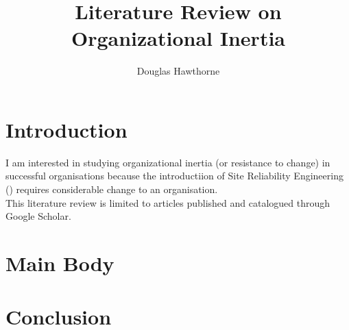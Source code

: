 \documentclass[]{report}
\title{Literature Review on Organizational Inertia}
\author{Douglas Hawthorne}
\begin{document}
\maketitle

\begin{abstract}
\end{abstract}

\tableofcontents

\chapter{Introduction}
I am interested in studying organizational inertia (or resistance to change) in successful organisations because the introductiion of Site Reliability Engineering (\cite{beyer2016site}) requires considerable change to an organisation.\\

This literature review is limited to articles published and catalogued through Google Scholar.\\

\chapter{Main Body}





\chapter{Conclusion}


\end{document}
